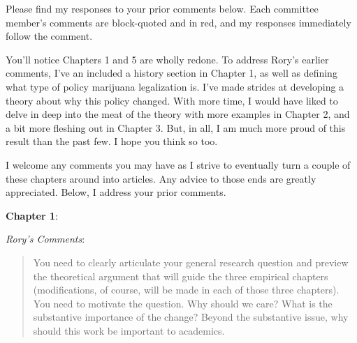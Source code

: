 \documentclass[12pt,stdletter,dateno,sigleft]{newlfm} %
\begin{document}
\begin{newlfm}


Please find my responses to your prior comments below. Each committee member's comments are block-quoted and in {\color{red}red}, and my responses immediately follow the comment. \newline

You'll notice Chapters 1 and 5 are wholly redone. To address Rory's earlier comments, I've an included a history section in Chapter 1, as well as defining what type of policy marijuana legalization is. I've made strides at developing a theory about why this policy changed. With more time, I would have liked to delve in deep into the meat of the theory with more examples in Chapter 2, and a bit more fleshing out in Chapter 3. But, in all, I am much more proud of this result than the past few. I hope you think so too.\newline


I welcome any comments you may have as I strive to eventually turn a couple of these chapters around into articles. Any advice to those ends are greatly appreciated. Below, I address your prior comments. %


\textbf{Chapter 1}:

\textit{Rory's Comments}:

\begin{quotation}{\color{red}\noindent \footnotesize
You need to clearly articulate your general research question and preview the theoretical argument that will guide the three empirical chapters (modifications, of course, will be made in each of those three chapters).  You need to motivate the question.  Why should we care?  What is the substantive importance of the change?  Beyond the substantive issue, why should this work be important to academics.
}
\end{quotation}




\end{newlfm}
\end{document}
